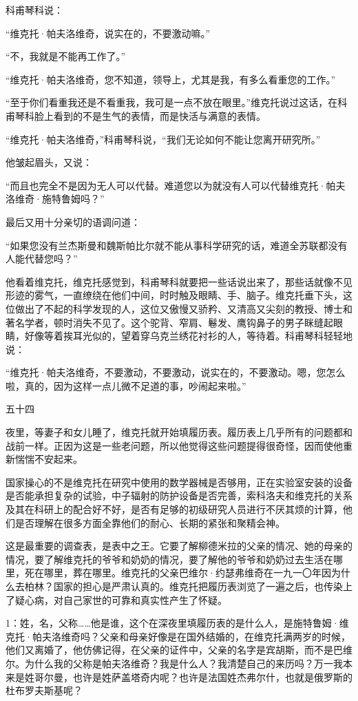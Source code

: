 科甫琴科说：

“维克托·帕夫洛维奇，说实在的，不要激动嘛。”

“不，我就是不能再工作了。”

“维克托·帕夫洛维奇，您不知道，领导上，尤其是我，有多么看重您的工作。”

“至于你们看重我还是不看重我，我可是一点不放在眼里。”维克托说过这话，在科甫琴科脸上看到的不是生气的表情，而是快活与满意的表情。

“维克托·帕夫洛维奇，”科甫琴科说，“我们无论如何不能让您离开研究所。”

他皱起眉头，又说：

“而且也完全不是因为无人可以代替。难道您以为就没有人可以代替维克托·帕夫洛维奇·施特鲁姆吗？”

最后又用十分亲切的语调问道：

“如果您没有兰杰斯曼和魏斯帕比尔就不能从事科学研究的话，难道全苏联都没有人能代替您吗？”

他看着维克托，维克托感觉到，科甫琴科就要把一些话说出来了，那些话就像不见形迹的雾气，一直缭绕在他们中间，时时触及眼睛、手、脑子。维克托垂下头，这位做出了不起的科学发现的人，这位又傲慢又骄矜、又清高又尖刻的教授、博士和著名学者，顿时消失不见了。这个驼背、窄肩、鬈发、鹰钩鼻子的男子眯缝起眼睛，好像等着挨耳光似的，望着穿乌克兰绣花衬衫的人，等待着。科甫琴科轻轻地说：

“维克托·帕夫洛维奇，不要激动，不要激动，说实在的，不要激动。嗯，您怎么啦，真的，因为这样一点儿微不足道的事，吵闹起来啦。”

五十四

夜里，等妻子和女儿睡了，维克托就开始填履历表。履历表上几乎所有的问题都和战前一样。正因为这是一些老问题，所以他觉得这些问题提得很奇怪，因而使他重新惴惴不安起来。

国家操心的不是维克托在研究中使用的数学器械是否够用，正在实验室安装的设备是否能承担复杂的试验，中子辐射的防护设备是否完善，索科洛夫和维克托的关系及其在科研上的配合好不好，是否有足够的初级研究人员进行不厌其烦的计算，他们是否理解在很多方面全靠他们的耐心、长期的紧张和聚精会神。

这是最重要的调查表，是表中之王。它要了解柳德米拉的父亲的情况、她的母亲的情况，要了解维克托的爷爷和奶奶的情况，要了解他的爷爷和奶奶过去生活在哪里，死在哪里，葬在哪里。维克托的父亲巴维尔·约瑟弗维奇在一九一〇年因为什么去柏林？国家的担心是严肃认真的。维克托把履历表浏览了一遍之后，也传染上了疑心病，对自己家世的可靠和真实性产生了怀疑。

1：姓，名，父称……他是谁，这个在深夜里填履历表的是什么人，是施特鲁姆·维克托·帕夫洛维奇吗？父亲和母亲好像是在国外结婚的，在维克托满两岁的时候，他们又离婚了，他仿佛记得，在父亲的证件中，父亲的名字是宾胡斯，而不是巴维尔。为什么我的父称是帕夫洛维奇？我是什么人？我清楚自己的来历吗？万一我本来是姓哥尔曼，也许是姓萨盖塔奇内呢？也许是法国姓杰弗尔什，也就是俄罗斯的杜布罗夫斯基呢？

